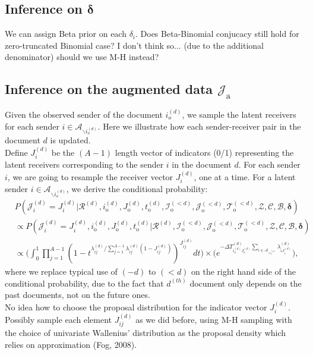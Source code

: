 \documentclass[a4paper]{article}
\begin{document}
 \subsection{Inference on $\boldsymbol{\delta}$}
 We can assign Beta prior on each $\delta_i$. Does Beta-Binomial conjucacy still hold for zero-truncated Binomial case? I don't think so... (due to the additional denominator) should we use M-H instead?
  \subsection{Inference on the augmented data $\mathcal{J}_{\mbox{a}}$}
     Given the observed sender of the document $i_o^{(d)}$, we sample the latent receivers for each sender $i \in \mathcal{A}_{\backslash i_o^{(d)}}$. Here we illustrate how each sender-receiver pair in the document $d$ is updated.\\\newline
       Define ${J}^{(d)}_{i}$ be the $(A-1)$ length vector of indicators (0/1) representing the latent receivers corresponding to the sender $i$ in the document $d$. For each sender $i$, we are going to resample the receiver vector ${J}^{(d)}_{i}$, one at a time. For a latent sender $i \in \mathcal{A}_{\backslash i_o^{(d)}}$, we derive the conditional probability:\\
       \begin{equation}
       \begin{aligned}
       &P(\mathcal{J}^{(d)}_{i} = {J}^{(d)}_{i}|\mathcal{R}^{(d)}, i^{(d)}_{\mbox{o}}, J^{(d)}_{\mbox{o}}, t^{(d)}_{\mbox{o}}, \mathcal{I}^{(<d)}_{\mbox{o}}, \mathcal{J}^{(<d)}_{\mbox{o}}, \mathcal{T}^{(<d)}_{\mbox{o}}, \mathcal{Z}, \mathcal{C}, \mathcal{B}, \boldsymbol{\delta})\\&\propto P(\mathcal{J}^{(d)}_{i} ={J}^{(d)}_{i}, i^{(d)}_{\mbox{o}}, J^{(d)}_{\mbox{o}}, t^{(d)}_{\mbox{o}}|\mathcal{R}^{(d)}, \mathcal{I}^{(<d)}_{\mbox{o}}, \mathcal{J}^{(<d)}_{\mbox{o}}, \mathcal{T}^{(<d)}_{\mbox{o}}, \mathcal{Z}, \mathcal{C}, \mathcal{B}, \boldsymbol{\delta})
       \\&\propto  \Big(\int_0^1\prod_{j=1}^{A-1}(1-t^{\lambda_{ij}^{(d)} /  \sum_{j = 1}^{A-1} \lambda_{ij}^{(d)}(1-J_{ij}^{(d)})})^{J_{ij}^{(d)}}dt \Big)\times \Big(e^{-\Delta T^{(d)}_{i_o^{(d)}J_o^{(d)}}\sum\limits_{i\in \mathcal{A}_{\backslash i_o^{(d)}}}\lambda^{(d)}_{iJ^{(d)}_{i}}}\Big),
       \end{aligned}
       \end{equation}
       where we replace typical use of $(-d)$ to $(<d)$ on the right hand side of the conditional probability, due to the fact that $d^{(th)}$ document only depends on the past documents, not on the future ones.\\ \newline
       No idea how to choose the proposal distribution for the indicator vector $J_i^{(d)}$. Possibly sample each element $J_{ij}^{(d)}$ as we did before, using M-H sampling with the choice of univariate Wallenius' distribution as the proposal density which relies on approximation (Fog, 2008).
\end{document}
